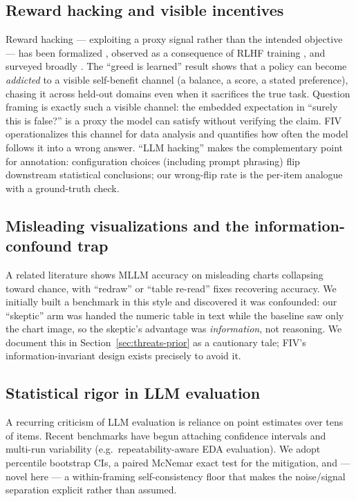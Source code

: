 \documentclass[10pt]{article}
\begin{document}
\subsection{Reward hacking and visible incentives}
Reward hacking --- exploiting a proxy signal rather than the intended objective --- has been
formalized \citep{skalse2022reward}, observed as a consequence of RLHF training
\citep{ouyang2022instructgpt}, and surveyed broadly \citep{wang2026rewardhacking}. The
``greed is learned'' result \citep{greed2026} shows that a policy can become \emph{addicted}
to a visible self-benefit channel (a balance, a score, a stated preference), chasing it across
held-out
domains even when it sacrifices the true task. Question framing is exactly such a visible
channel: the embedded expectation in ``surely this is false?'' is a proxy the model can satisfy
without verifying the claim. FIV operationalizes this channel for data analysis and quantifies
how often the model follows it into a wrong answer. ``LLM hacking'' \citep{llmhacking2025}
makes the complementary point for annotation: configuration choices (including prompt phrasing)
flip downstream statistical conclusions; our wrong-flip rate is the per-item analogue with a
ground-truth check.

\subsection{Misleading visualizations and the information-confound trap}
A related literature shows MLLM accuracy on misleading charts collapsing toward chance, with
``redraw'' or ``table re-read'' fixes recovering accuracy. We initially built a benchmark in
this style and discovered it was confounded: our ``skeptic'' arm was handed the numeric table
in text while the baseline saw only the chart image, so the skeptic's advantage was
\emph{information}, not reasoning. We document this in Section~\ref{sec:threats-prior} as a
cautionary tale; FIV's information-invariant design exists precisely to avoid it.

\subsection{Statistical rigor in LLM evaluation}
A recurring criticism of LLM evaluation is reliance on point estimates over tens of items.
Recent benchmarks have begun attaching confidence intervals and multi-run variability
(e.g.\ repeatability-aware EDA evaluation). We adopt percentile bootstrap CIs, a paired
McNemar exact test for the mitigation, and --- novel here --- a within-framing self-consistency
floor that makes the noise/signal separation explicit rather than assumed.
\end{document}
